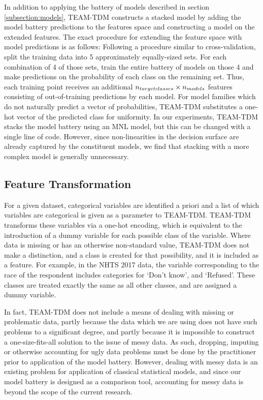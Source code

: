 \documentclass[conference]{IEEEtran}
\begin{document}
In addition to applying the battery of models described in section \ref{subsection:models}, TEAM-TDM constructs a stacked model by adding the model battery predictions to the features space and constructing a model on the extended features.
 The exact procedure for extending the feature space with model predictions is as follows:
 Following a procedure similar to cross-validation, split the training data into 5 approximately equally-sized sets.
 For each combination of 4 of those sets, train the entire battery of models on those 4 and make predictions on the probability of each class on the remaining set.
 Thus, each training point receives an additional $n_{\mbox{\footnotesize target classes}} \times n_{\mbox{\footnotesize models}}$ features consisting of out-of-training predictions by each model.
 For model families which do not naturally predict a vector of probabilities, TEAM-TDM substitutes a one-hot vector of the predicted class for uniformity.
 In our experiments, TEAM-TDM stacks the model battery using an MNL model, but this can be changed with a single line of code.
 However, since non-linearities in the decision surface are already captured by the constituent models, we find that stacking with a more complex model is generally unnecessary.

\subsection{Feature Transformation} \label{subsection:transformation}

For a given dataset, categorical variables are identified a priori and a list of which variables are categorical is given as a parameter to TEAM-TDM.
 TEAM-TDM transforms these variables via a one-hot encoding, which is equivalent to the introduction of a dummy variable for each possible class of the variable.
 Where data is missing or has an otherwise non-standard value, TEAM-TDM does not make a distinction, and a class is created for that possibility, and it is included as a feature.
 For example, in the NHTS 2017 data, the variable corresponding to the race of the respondent includes categories for `Don't know', and `Refused'.
 These classes are treated exactly the same as all other classes, and are assigned a dummy variable.
 
In fact, TEAM-TDM does not include a means of dealing with missing or problematic data, partly because the data which we are using does not have such problems to a significant degree, and partly because it is impossible to construct a one-size-fits-all solution to the issue of messy data.
 As such, dropping, imputing or otherwise accounting for ugly data problems must be done by the practitioner prior to application of the model battery.
 However, dealing with messy data is an existing problem for application of classical statistical models, and since our model battery is designed as a comparison tool, accounting for messy data is beyond the scope of the current research.
\end{document}
